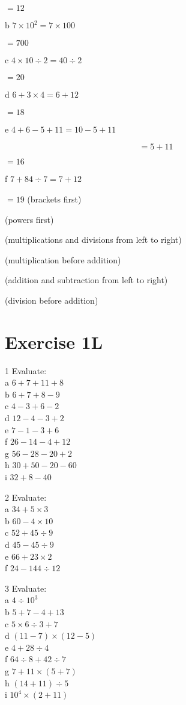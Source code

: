 \documentclass[10pt]{article}
\begin{document}
\(=12\)

b \(7 \times 10^{2}=7 \times 100\)

\(=700\)

c \(4 \times 10 \div 2=40 \div 2\)

\(=20\)

d \(6+3 \times 4=6+12\)

\(=18\)

e \(4+6-5+11=10-5+11\)

\[
=5+11
\]

\(=16\)

f \(7+84 \div 7=7+12\)

\(=19\) (brackets first)

(powers first)

(multiplications and divisions from left to right)

(multiplication before addition)

(addition and subtraction from left to right)

(division before addition)

\section*{Exercise 1L}
1 Evaluate:\\
a \(6+7+11+8\)\\
b \(6+7+8-9\)\\
c \(4-3+6-2\)\\
d \(12-4-3+2\)\\
e \(7-1-3+6\)\\
f \(26-14-4+12\)\\
g \(56-28-20+2\)\\
h \(30+50-20-60\)\\
i \(32+8-40\)

2 Evaluate:\\
a \(34+5 \times 3\)\\
b \(60-4 \times 10\)\\
c \(52+45 \div 9\)\\
d \(45-45 \div 9\)\\
e \(66+23 \times 2\)\\
f \(24-144 \div 12\)

3 Evaluate:\\
a \(4 \div 10^{3}\)\\
b \(5+7-4+13\)\\
c \(5 \times 6 \div 3+7\)\\
d \((11-7) \times(12-5)\)\\
e \(4+28 \div 4\)\\
f \(64 \div 8+42 \div 7\)\\
g \(7+11 \times(5+7)\)\\
h \((14+11) \div 5\)\\
i \(10^{4} \times(2+11)\)
\end{document}
